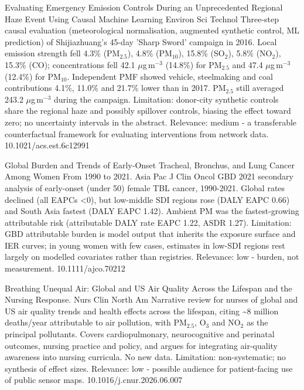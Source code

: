 \documentclass[10pt]{article}
\begin{document}
\par{}\baselineskip{}\baselineskip
{}

{Evaluating Emergency Emission Controls During an Unprecedented Regional Haze Event Using Causal Machine Learning}
{Environ Sci Technol}
{Three-step causal evaluation (meteorological normalisation, augmented synthetic control, ML prediction) of Shijiazhuang's 45-day 'Sharp Sword' campaign in 2016. Local emission strength fell 4.3\% (PM$_{2.5}$), 4.8\% (PM$_{10}$), 15.8\% (SO$_2$), 5.8\% (NO$_2$), 15.3\% (CO); concentrations fell 42.1 $\mu$g\,m$^{-3}$ (14.8\%) for PM$_{2.5}$ and 47.4 $\mu$g\,m$^{-3}$ (12.4\%) for PM$_{10}$. Independent PMF showed vehicle, steelmaking and coal contributions 4.1\%, 11.0\% and 21.7\% lower than in 2017. PM$_{2.5}$ still averaged 243.2 $\mu$g\,m$^{-3}$ during the campaign. Limitation: donor-city synthetic controls share the regional haze and possibly spillover controls, biasing the effect toward zero; no uncertainty intervals in the abstract. Relevance: medium - a transferable counterfactual framework for evaluating interventions from network data.}
{10.1021/acs.est.6c12991}

{Global Burden and Trends of Early-Onset Tracheal, Bronchus, and Lung Cancer Among Women From 1990 to 2021.}
{Asia Pac J Clin Oncol}
{GBD 2021 secondary analysis of early-onset (under 50) female TBL cancer, 1990-2021. Global rates declined (all EAPCs <0), but low-middle SDI regions rose (DALY EAPC 0.66) and South Asia fastest (DALY EAPC 1.42). Ambient PM was the fastest-growing attributable risk (attributable DALY rate EAPC 1.22, ASDR 1.27). Limitation: GBD attributable burden is model output that inherits the exposure surface and IER curves; in young women with few cases, estimates in low-SDI regions rest largely on modelled covariates rather than registries. Relevance: low - burden, not measurement.}
{10.1111/ajco.70212}

{Breathing Unequal Air: Global and US Air Quality Across the Lifespan and the Nursing Response.}
{Nurs Clin North Am}
{Narrative review for nurses of global and US air quality trends and health effects across the lifespan, citing \textasciitilde{}8 million deaths/year attributable to air pollution, with PM$_{2.5}$, O$_3$ and NO$_2$ as the principal pollutants. Covers cardiopulmonary, neurocognitive and perinatal outcomes, nursing practice and policy, and argues for integrating air-quality awareness into nursing curricula. No new data. Limitation: non-systematic; no synthesis of effect sizes. Relevance: low - possible audience for patient-facing use of public sensor maps.}
{10.1016/j.cnur.2026.06.007}
\end{document}
